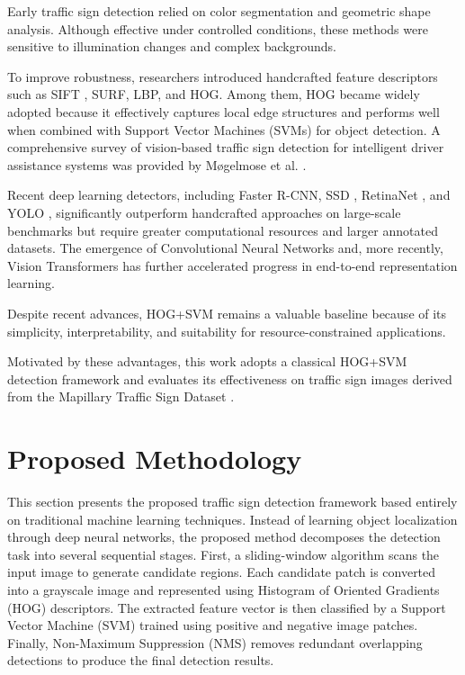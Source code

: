 \documentclass[11pt,a4paper,twoside]{article}
\begin{document}
Early traffic sign detection relied on color segmentation and geometric shape analysis. Although effective under controlled conditions, these methods were sensitive to illumination changes and complex backgrounds.

To improve robustness, researchers introduced handcrafted feature descriptors such as SIFT \cite{lowe2004sift}, SURF, LBP, and HOG. Among them, HOG became widely adopted because it effectively captures local edge structures and performs well when combined with Support Vector Machines (SVMs) \cite{boser1992svm} for object detection. A comprehensive survey of vision-based traffic sign detection for intelligent driver assistance systems was provided by M{\o}gelmose et al. \cite{mogelmose2012survey}.

Recent deep learning detectors, including Faster R-CNN, SSD \cite{liu2016ssd}, RetinaNet \cite{lin2017retinanet}, and YOLO \cite{ren2015faster, redmon2016yolo}, significantly outperform handcrafted approaches on large-scale benchmarks but require greater computational resources and larger annotated datasets. The emergence of Convolutional Neural Networks \cite{lecun1998lenet} and, more recently, Vision Transformers \cite{dosovitskiy2021vit} has further accelerated progress in end-to-end representation learning.

Despite recent advances, HOG+SVM remains a valuable baseline because of its simplicity, interpretability, and suitability for resource-constrained applications.

Motivated by these advantages, this work adopts a classical HOG+SVM detection framework and evaluates its effectiveness on traffic sign images derived from the Mapillary Traffic Sign Dataset \cite{ertler2020mapillary}.



\section{Proposed Methodology}

This section presents the proposed traffic sign detection framework based entirely on traditional machine learning techniques. Instead of learning object localization through deep neural networks, the proposed method decomposes the detection task into several sequential stages. First, a sliding-window algorithm scans the input image to generate candidate regions. Each candidate patch is converted into a grayscale image and represented using Histogram of Oriented Gradients (HOG) descriptors. The extracted feature vector is then classified by a Support Vector Machine (SVM) trained using positive and negative image patches. Finally, Non-Maximum Suppression (NMS) removes redundant overlapping detections to produce the final detection results.
\end{document}
